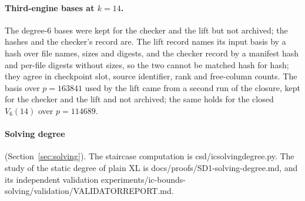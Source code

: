 \documentclass[11pt]{article}
\theoremstyle{definition}\newtheorem{definition}[theorem]{Definition}
\theoremstyle{remark}\newtheorem{remark}[theorem]{Remark}
\newcommand{\codeus}{\textunderscore\allowbreak}
\newcommand{\code}[1]{{\ttfamily\let\_\codeus#1}}
\begin{document}
\paragraph{Third-engine bases at $k=14$.} The degree-$6$ bases were kept
for the checker and the lift but not archived; the hashes and the checker's
record are. The lift record names its input basis by a hash over file names,
sizes and digests, and the checker record by a manifest hash and per-file
digests without sizes, so the two cannot be matched hash for hash; they
agree in checkpoint slot, source identifier, rank and free-column counts.
The basis over $p=163841$ used by the lift came from a second run of the
closure, kept for the checker and the lift and not archived; the same holds
for the closed $V_6(14)$ over $p=114689$.

\paragraph{Solving degree} (Section~\ref{sec:solving}). The staircase
computation is \code{csd/ic\_solving\_degree.py}. The study of the static
degree of plain XL is
\code{docs/\allowbreak{}proofs/\allowbreak{}SD1-solving-degree.md}, and its
independent validation
\code{experiments/\allowbreak{}ic-bounds-solving/\allowbreak{}validation/\allowbreak{}VALIDATOR\_REPORT.md}.
\footnotesize
\end{document}
